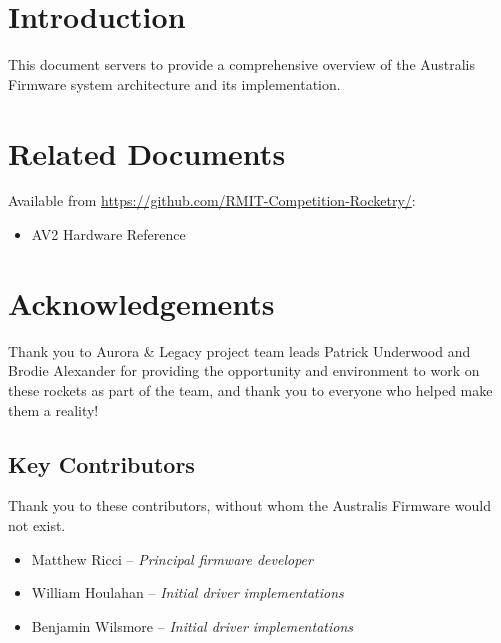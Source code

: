\documentclass[a4paper, oneside, british]{memoir}
\newcommand{\setdocname}[1]{\def\docname{#1}}
\newcommand{\docname}{}
\newcommand{\setsysname}[1]{\def\sysname{#1}}
\newcommand{\sysname}{}
\newcommand{\setorglabel}[1]{\def\orglabel{#1}}
\newcommand{\orglabel}{}
\newlength{\margindedent}
\numberwithin{figure}{section}
\begin{document}
  \setorglabel{AUSTRALIS AVIONICS} 
  \setsysname{Australis}
  \setdocname{Firmware Design Document}


  \vspace*{-1in}
  \noindent{}

  \section*{\hspace{-\margindedent}Introduction}
  This document servers to provide a comprehensive overview of the Australis Firmware system architecture and its implementation.
  
  \section*{\hspace{-\margindedent}Related Documents}
  Available from \url{https://github.com/RMIT-Competition-Rocketry/}:
  \vspace{-0.5em}
  \begin{itemize}
    \item AV2 Hardware Reference
  \end{itemize}
  
  \section*{\hspace{-\margindedent}Acknowledgements}
  Thank you to Aurora \& Legacy project team leads Patrick Underwood and Brodie Alexander for providing the opportunity and environment to work on these rockets as part of the team, and thank you to everyone who helped make them a reality!

  \subsection*{\hspace{-\margindedent}Key Contributors}
  Thank you to these contributors, without whom the Australis Firmware would not exist.
  \vspace{-0.5em}
  \begin{itemize}
    \setlength{\itemindent}{2em}
    \item Matthew Ricci     -- \textit{Principal firmware developer}
    \item William Houlahan  -- \textit{Initial driver implementations}
    \item Benjamin Wilsmore -- \textit{Initial driver implementations}
  \end{itemize}
\end{document}

